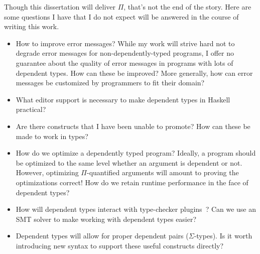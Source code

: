 \begin{proposal}
Though this dissertation will deliver $\Pi$, that's not the end of the story.
Here are some questions I have that I do not expect will be answered in the
course of writing this work.
\begin{itemize}
\item How to improve error messages? While my work will strive hard not to
degrade error messages for non-dependently-typed programs, I offer no
guarantee about the quality of error messages in programs with lots of
dependent types. How can these be improved? More generally, how can error
messages be customized by programmers to fit their domain?

\item What editor support is necessary to make dependent types in Haskell
practical?

\item Are there constructs that I have been unable to promote? How can these
be made to work in types?

\item How do we optimize a dependently typed program? Ideally, a program should
be optimized to the same level whether an argument is dependent or not. However,
optimizing $\Pi$-quantified arguments will amount to proving the optimizations
correct! How do we retain runtime performance in the face of dependent types?

\item How will dependent types interact with type-checker
  plugins~\cite{type-checker-plugins}? Can we use an SMT solver to make working
  with dependent types easier?

\item Dependent types will allow for proper dependent pairs ($\Sigma$-types).
  Is it worth introducing new syntax to support these useful constructs directly?
\end{itemize}
\end{proposal}

